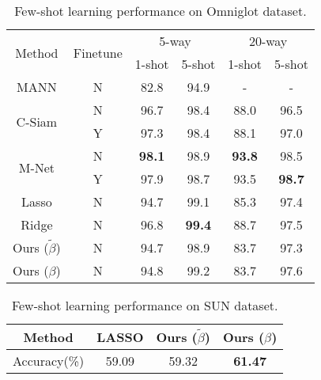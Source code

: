 \documentclass{article}
\providecommand{\tabularnewline}{\\}
\begin{document}
\begin{table}
\centering{}{\small{}\label{my-label} }%
\small
\begin{tabular}{cccccc}
\hline
\multirow{2}{*}{{\small{}Method }} & \multirow{2}{*}{{\small{}Finetune}} & \multicolumn{2}{c}{{\small{}{}5-way}} & \multicolumn{2}{c}{{\small{}{}20-way}}\tabularnewline
\cline{3-6}
 &  & \multicolumn{1}{c}{{\small{}{}1-shot }} & \multicolumn{1}{c}{{\small{}{}5-shot }} & \multicolumn{1}{c}{{\small{}{}1-shot }} & {\small{}{}5-shot }\tabularnewline
\hline
 \hline{\small{}{}{}MANN}  & {\small{}{}{}N}  & {\small{}{}{}{82.8}}  & {\small{}{}{}{94.9}}  & {\small{}{}{}{-}}  & {\small{}{}{}{-} }\tabularnewline
\hline
\multirow{2}{*}{{\small{}C-Siam} } & \multicolumn{1}{c}{{\small{}{}{}N }} & \multicolumn{1}{c}{{\small{}{}{}96.7 }} & \multicolumn{1}{c}{{\small{}{}{}98.4 }} & \multicolumn{1}{c}{{\small{}{}{}88.0 }} & {\small{}{}{}96.5 }\tabularnewline
\cline{2-6}
 & {\small{}{}{}Y}  & {\small{}{}{}97.3}  & {\small{}{}{}98.4}  & {\small{}{}{}88.1}  & {\small{}{}{}97.0 }\tabularnewline
\hline
\multirow{2}{*}{{\small{}M-Net} } & {\small{}{}{}N}  & \textbf{\small{}{}{}98.1}  & {\small{}{}{}98.9}  & \textbf{\small{}{}{}93.8}  & {\small{}{}{}98.5 }\tabularnewline
\cline{2-6}
 & {\small{}{}{}Y}  & {\small{}{}{}97.9}  & {\small{}{}{}98.7}  & {\small{}{}{}93.5}  & \textbf{\small{}{}{}98.7 }\tabularnewline
\hline
\hline{\small{}{}{}Lasso}  & {\small{}{}{}N}  & {\small{}{}{}94.7}  & {\small{}{}{}99.1}  & {\small{}{}{}85.3}  & {\small{}{}{}97.4 }\tabularnewline
\hline{\small{}{}{}Ridge}  & {\small{}{}{}N}  & {\small{}{}{}96.8}  & \textbf{\small{}{}{}99.4}  & {\small{}{}{}88.7}  & {\small{}{}{}97.5 }\tabularnewline
\hline{\small{}{}{}Ours ($\tilde{\beta}$)}  & {\small{}{}{}N}  & {\small{}{}{}94.7} & {\small{}{}{}98.9}  &  {\small{}{}{}83.7} & {\small{}{}{}97.3 }\tabularnewline
\hline{\small{}{}{}Ours (${\beta}$)}  & {\small{}{}{}N}  & {\small{}{}{}94.8}  & {\small{}{}{}99.2}  & {\small{}{}{}83.7} & {\small{}{}{}97.6 }\tabularnewline
\hline
\end{tabular}{\small{}\caption{{\small{}{}{}\label{tab:Results-on-few-shot}
{Few-shot learning performance on Omniglot dataset.}}}
}
\end{table}






\begin{table}[]
\centering{}{\small{}\label{my-label} }%
\small
\begin{tabular}{c|c|c|c}
\hline
Method       & LASSO & Ours ($\tilde{\beta}$)  & Ours ($\beta$) \\ \hline
Accuracy(\%) & 59.09 & 59.32 & \textbf{61.47}                          \\ \hline
\end{tabular}
\caption{{Few-shot learning performance on SUN dataset.} }
\label{tab:sun}
\end{table}
\end{document}
